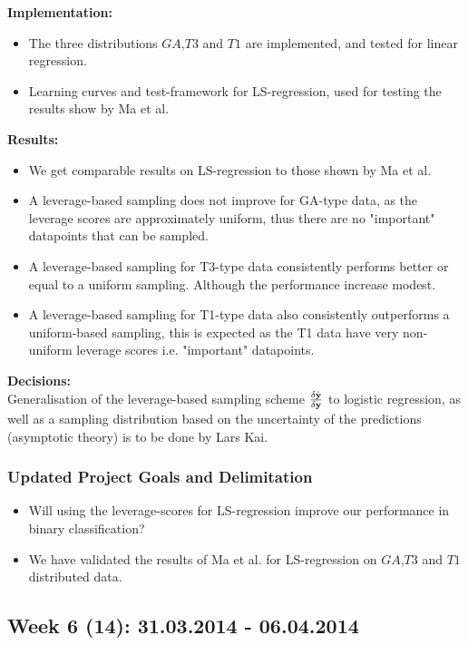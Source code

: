 \textbf{Implementation:}\\
\begin{itemize}
\item The three distributions $GA$,$T3$ and $T1$ are implemented, and tested for linear regression.
\item Learning curves and test-framework for LS-regression, used for testing the results show by Ma et al.
\end{itemize}

\textbf{Results:}\\
\begin{itemize}
\item We get comparable results on LS-regression to those shown by Ma et al.
\item A leverage-based sampling does not improve for GA-type data, as the leverage scores are approximately uniform, thus there are no "important" datapoints that can be sampled.
\item A leverage-based sampling for T3-type data consistently performs better or equal to a uniform sampling. Although the performance increase modest.
\item A leverage-based sampling for T1-type data also consistently outperforms a uniform-based sampling, this is expected as the T1 data have very non-uniform leverage scores i.e. "important" datapoints. 
\end{itemize}

\textbf{Decisions:}\\
Generalisation of the leverage-based sampling scheme $\frac{\delta \hat{{\bf y}}}{\delta {\bf y}}$ to logistic regression, as well as a sampling distribution based on the uncertainty of the predictions (asymptotic theory) is to be done by Lars Kai.

\subsubsection*{Updated Project Goals and Delimitation}
\begin{itemize}
\item Will using the leverage-scores for LS-regression improve our performance in binary classification?
\item We have validated the results of Ma et al. for LS-regression on $GA$,$T3$ and $T1$ distributed data.
\end{itemize}
\subsection*{Week 6 (14): 31.03.2014 - 06.04.2014}
